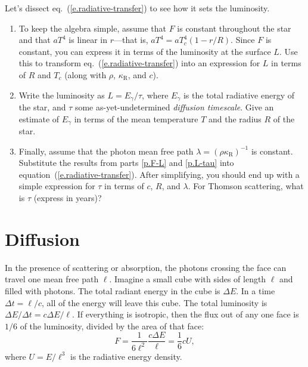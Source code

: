 \begin{exercisebox}
\label{ex.radiative-transfer-diffusion}
Let's dissect eq.~(\ref{e.radiative-transfer}) to see how it sets the luminosity.  
\begin{enumerate}
\item\label{p.F-L}
To keep the algebra simple, assume that $F$ is constant throughout the star and that $aT^{4}$ is linear in $r$---that is, $aT^{4} = aT_{c}^{4}(1-r/R)$.  Since $F$ is constant, you can express it in terms of the luminosity at the surface $L$.  Use this to transform eq.~(\ref{e.radiative-transfer}) into an expression for $L$ in terms of $R$ and $T_{c}$ (along with $\rho$, $\kappa_{\mathrm{R}}$, and $c$).

\item\label{p.L-tau}
Write the luminosity as $L = E_{\gamma}/\tau$, where $E_{\gamma}$ is the total radiative energy of the star, and $\tau$ some as-yet-undetermined \emph{diffusion timescale}.  Give an estimate of $E_{\gamma}$ in terms of the mean temperature $T$ and the radius $R$ of the star.

\item\label{p.tau}
Finally, assume that the photon mean free path $\lambda = (\rho\kappa_{\mathrm{R}})^{-1}$ is constant.  Substitute the results from parts \ref{p.F-L} and \ref{p.L-tau} into equation~(\ref{e.radiative-transfer}).  After simplifying, you should end up with a simple expression for $\tau$ in terms of $c$, $R$, and $\lambda$.  For Thomson scattering, what is $\tau$ (express in years)?
\end{enumerate}
\end{exercisebox}

\section{Diffusion}\label{s.diffusion}

In the presence of scattering or absorption, the photons crossing the face can travel one mean free path $\ell$. Imagine a small cube with sides of length $\ell$ and filled with photons. The total radiant energy in the cube is $\Delta E$. In a time $\Delta t = \ell/c$, all of the energy will leave this cube. The total luminosity is $\Delta E/\Delta t = c\Delta E/\ell$. If everything is isotropic, then the flux out of any one face is $1/6$ of the luminosity, divided by the area of that face:
\[
	F = \frac{1}{6\ell^{2}}\frac{c\Delta E}{\ell} = \frac{1}{6}c U,
\]
where $U = E/\ell^{3}$ is the radiative energy density. 

